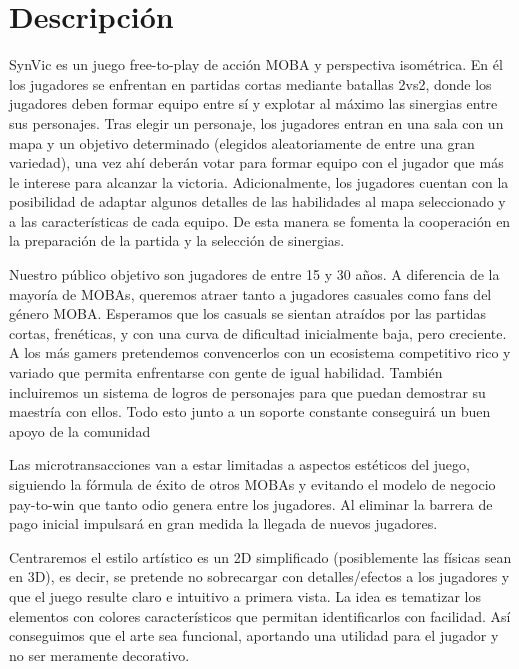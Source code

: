 \chapter{Descripción}

SynVic es un juego free-to-play de acción MOBA y perspectiva isométrica. En él los jugadores se enfrentan en partidas cortas mediante batallas 2vs2, donde los jugadores deben formar equipo entre sí y explotar al máximo las sinergias entre sus personajes. Tras elegir un personaje, los jugadores entran en una sala con un mapa y un objetivo determinado (elegidos aleatoriamente de entre una gran variedad), una vez ahí deberán votar para formar equipo con el jugador que más le interese para alcanzar la victoria. Adicionalmente, los jugadores cuentan con la posibilidad de adaptar algunos detalles de las habilidades al mapa seleccionado y a las características de cada equipo. De esta manera se fomenta la cooperación en la preparación de la partida y la selección de sinergias.

\vspace{\baselineskip}

Nuestro público objetivo son jugadores de entre 15 y 30 años. A diferencia de la mayoría de MOBAs, queremos atraer tanto a jugadores casuales como fans del género MOBA. Esperamos que los casuals se sientan atraídos por las partidas cortas, frenéticas, y con una curva de dificultad inicialmente baja, pero creciente. A los más gamers pretendemos convencerlos con un ecosistema competitivo rico y variado que permita enfrentarse con gente de igual habilidad. También incluiremos un sistema de logros de personajes para que puedan demostrar su maestría con ellos. Todo esto junto a un soporte constante conseguirá un buen apoyo de la comunidad

\vspace{\baselineskip}

Las microtransacciones van a estar limitadas a aspectos estéticos del juego, siguiendo la fórmula de éxito de otros MOBAs y evitando el modelo de negocio pay-to-win que tanto odio genera entre los jugadores. Al eliminar la barrera de pago inicial impulsará en gran medida la llegada de nuevos jugadores.

\vspace{\baselineskip}

Centraremos el estilo artístico es un 2D simplificado (posiblemente las físicas sean en 3D), es decir, se pretende no sobrecargar con detalles/efectos a los jugadores y que el juego resulte claro e intuitivo a primera vista. La idea es tematizar los elementos con colores característicos que permitan identificarlos con facilidad. Así conseguimos que el arte sea funcional, aportando una utilidad para el jugador y no ser meramente decorativo.
